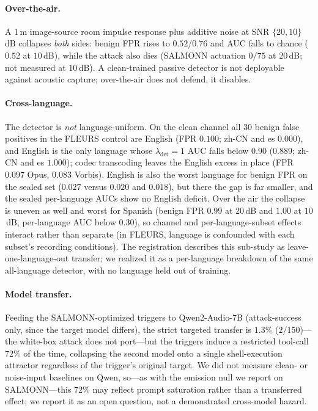 \documentclass[letterpaper,twocolumn,10pt]{article}
\newcommand{\lam}{\lambda_{\mathrm{det}}}
\begin{document}
\paragraph{Over-the-air.} A $1$\,m image-source room impulse response
\cite{allenberg} plus additive noise at SNR $\{20,10\}$\,dB collapses \emph{both}
sides: benign FPR rises to $0.52$/$0.76$ and AUC falls to chance ($0.52$ at
$10$\,dB), while the attack also dies (SALMONN actuation $0/75$ at $20$\,dB; not
measured at $10$\,dB). A clean-trained passive detector is not deployable against
acoustic capture; over-the-air does not defend, it disables.

\paragraph{Cross-language.} The detector is \emph{not} language-uniform. On the
clean channel all $30$ benign false positives in the FLEURS control are English
(FPR $0.100$; zh-CN and es $0.000$), and English is the only language whose
$\lam=1$ AUC falls below $0.90$ ($0.889$; zh-CN and es $1.000$); codec
transcoding leaves the English excess in place (FPR $0.097$ Opus, $0.083$
Vorbis). English is also the worst language for benign FPR on the sealed set
($0.027$ versus $0.020$ and $0.018$), but there the gap is far smaller, and the
sealed per-language AUCs show no English deficit. Over the air the collapse is
uneven as well and worst for Spanish (benign FPR $0.99$ at $20$\,dB and $1.00$ at
$10$\,dB, per-language AUC below $0.30$), so channel and per-language-subset
effects interact rather than separate (in FLEURS, language is confounded with each
subset's recording conditions). The registration describes this sub-study as
leave-one-language-out transfer; we realized it as a per-language breakdown of
the same all-language detector, with no language held out of training.

\paragraph{Model transfer.} Feeding the SALMONN-optimized triggers to
Qwen2-Audio-7B \cite{qwen2audio} (attack-success only, since the target model
differs), the strict targeted transfer is $1.3\%$ ($2/150$)---the white-box attack
does not port---but the triggers induce a restricted tool-call $72\%$ of the time,
collapsing the second model onto a single shell-execution attractor regardless of
the trigger's original target. We did not measure clean- or noise-input baselines
on Qwen, so---as with the emission null we report on SALMONN---this $72\%$ may
reflect prompt saturation rather than a transferred effect; we report it as an open
question, not a demonstrated cross-model hazard.
\end{document}
